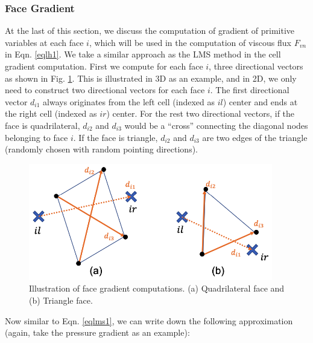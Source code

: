 \documentclass[12pt, letterpaper]{report}
\begin{document}
\subsubsection{Face Gradient}

At the last of this section, we discuss the computation of gradient of primitive variables at each
face $i$, which will be used in the computation of viscous flux $F_{vn}$ in Eqn. \ref{eqlh1}. We
take a similar approach as the LMS method in the cell gradient computation. First we compute for
each face $i$, three directional vectors as shown in Fig. \ref{figalg3}. This is illustrated in 3D
as an example, and in 2D, we only need to construct two directional vectors for each face $i$. The
first directional vector $d_{i1}$ always originates from the left cell (indexed as $il$) center and
ends at the right cell (indexed as $ir$) center. For the rest two directional vectors, if the face
is quadrilateral, $d_{i2}$ and $d_{i3}$ would be a ``cross'' connecting the diagonal nodes belonging
to face $i$. If the face is triangle, $d_{i2}$ and $d_{i3}$ are two edges of the triangle (randomly
chosen with random pointing directions).

\begin{figure}[H]
   \centering
   \includegraphics[height=2in]{Algorithm3.png}
   \caption{Illustration of face gradient computations. (a) Quadrilateral face and (b) Triangle
   face.}
   \label{figalg3}
\end{figure}

Now similar to Eqn. \ref{eqlms1}, we can write down the following approximation (again, take the
pressure gradient as an example):
\end{document}

